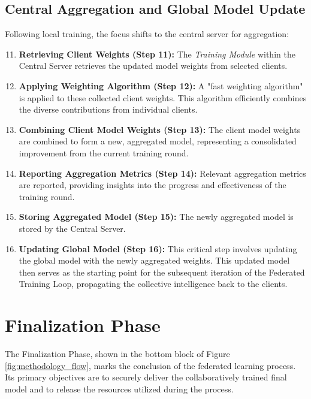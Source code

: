 \subsection{Central Aggregation and Global Model Update}
\label{ssec:central_aggregation}
Following local training, the focus shifts to the central server for aggregation:
\begin{enumerate}
    \setcounter{enumi}{10} %
    \item \textbf{Retrieving Client Weights (Step 11):} The \textit{Training Module} within the Central Server retrieves the updated model weights from selected clients.
    \item \textbf{Applying Weighting Algorithm (Step 12):} A "fast weighting algorithm" is applied to these collected client weights. This algorithm efficiently combines the diverse contributions from individual clients.
    \item \textbf{Combining Client Model Weights (Step 13):} The client model weights are combined to form a new, aggregated model, representing a consolidated improvement from the current training round.
    \item \textbf{Reporting Aggregation Metrics (Step 14):} Relevant aggregation metrics are reported, providing insights into the progress and effectiveness of the training round.
    \item \textbf{Storing Aggregated Model (Step 15):} The newly aggregated model is stored by the Central Server.
    \item \textbf{Updating Global Model (Step 16):} This critical step involves updating the global model with the newly aggregated weights. This updated model then serves as the starting point for the subsequent iteration of the Federated Training Loop, propagating the collective intelligence back to the clients.
\end{enumerate}

\section{Finalization Phase}
\label{sec:finalization_phase}

The Finalization Phase, shown in the bottom block of Figure \ref{fig:methodology_flow}, marks the conclusion of the federated learning process. Its primary objectives are to securely deliver the collaboratively trained final model and to release the resources utilized during the process.

